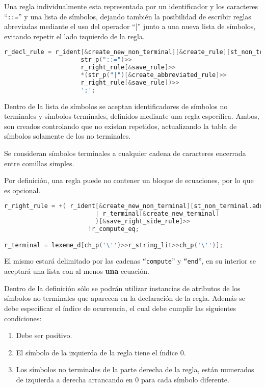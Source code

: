 Una regla individualmente esta representada por un identificador y los caracteres ``\texttt{::=}'' y una lista de símbolos, dejando también la posibilidad de escribir reglas abreviadas mediante el uso del operador ``|'' junto a una nueva lista de símbolos, evitando repetir el lado izquierdo de la regla.

\begin{lstlisting}[language=C++, basicstyle=\scriptsize, columns=fullflexible, linewidth=13cm]
r_decl_rule = r_ident[&create_new_non_terminal][&create_rule][st_non_terminal.add]>>
                     str_p("::=")>>
                     r_right_rule[&save_rule]>>
                     *(str_p("|")[&create_abbreviated_rule]>>
                     r_right_rule[&save_rule])>>
                     ';';
\end{lstlisting}

Dentro de la lista de símbolos se aceptan identificadores de símbolos no terminales y símbolos terminales, definidos mediante una regla específica. Ambos, son creados controlando que no existan repetidos, actualizando la tabla de símbolos solamente de los no terminales.

Se consideran símbolos terminales a cualquier cadena de caracteres encerrada entre comillas simples.

Por definición, una regla puede no contener un bloque de ecuaciones, por lo que es opcional.

\begin{lstlisting}[language=C++, basicstyle=\scriptsize, columns=fullflexible, linewidth=11cm]
r_right_rule = +( r_ident[&create_new_non_terminal][st_non_terminal.add]
                         | r_terminal[&create_new_terminal]
                         )[&save_right_side_rule]>>
                       !r_compute_eq;

r_terminal = lexeme_d[ch_p('\'')>>r_string_lit>>ch_p('\'')];
\end{lstlisting}

El mismo estará delimitado por las cadenas \texttt{``compute}'' y \texttt{``end}'', en su interior se aceptará una lista con al menos \textbf{una} ecuación.

Dentro de la definición sólo se podrán utilizar instancias de atributos de los símbolos no terminales que aparecen en la declaración de la regla. Además se debe especificar el índice de ocurrencia, el cual debe cumplir las siguientes condiciones:

\begin{enumerate}
\item Debe ser positivo.
\item El símbolo de la izquierda de la regla tiene el índice 0.
\item Los símbolos no terminales de la parte derecha de la regla, están numerados de izquierda a derecha arrancando en 0 para cada símbolo diferente.
\end{enumerate}

